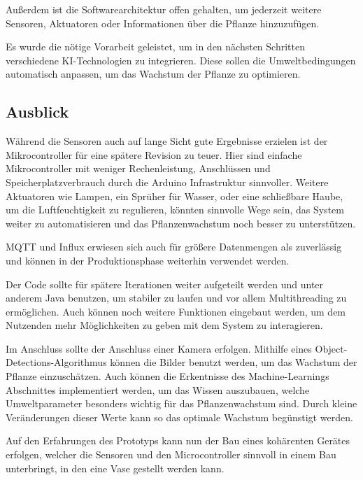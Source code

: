 Außerdem ist die Softwarearchitektur offen gehalten, um jederzeit weitere Sensoren, Aktuatoren oder Informationen über die Pflanze hinzuzufügen.

Es wurde die nötige Vorarbeit geleistet, um in den nächsten Schritten verschiedene KI-Technologien zu integrieren. Diese sollen die Umweltbedingungen automatisch anpassen, um das Wachstum der Pflanze zu optimieren.

\subsection{Ausblick}
Während die Sensoren auch auf lange Sicht gute Ergebnisse erzielen ist der Mikrocontroller für eine spätere Revision zu teuer. Hier sind einfache Mikrocontroller mit weniger Rechenleistung, Anschlüssen und Speicherplatzverbrauch durch die Arduino Infrastruktur sinnvoller. Weitere Aktuatoren wie Lampen, ein Sprüher für Wasser, oder eine schließbare Haube, um die Luftfeuchtigkeit zu regulieren, könnten sinnvolle Wege sein, das System weiter zu automatisieren und das Pflanzenwachstum noch besser zu unterstützen.

MQTT und Influx erwiesen sich auch für größere Datenmengen als zuverlässig und können in der Produktionsphase weiterhin verwendet werden.

Der Code sollte für spätere Iterationen weiter aufgeteilt werden und unter anderem Java benutzen, um stabiler zu laufen und vor allem Multithreading zu ermöglichen. Auch können noch weitere Funktionen eingebaut werden, um dem Nutzenden mehr Möglichkeiten zu geben mit dem System zu interagieren.

Im Anschluss sollte der Anschluss einer Kamera erfolgen. Mithilfe eines Object-Detections-Algorithmus können die Bilder benutzt werden, um das Wachstum der Pflanze einzuschätzen. Auch können die Erkentnisse des Machine-Learnings Abschnittes implementiert werden, um das Wissen auszubauen, welche Umweltparameter besonders wichtig für das Pflanzenwachstum sind. Durch kleine Veränderungen dieser Werte kann so das optimale Wachstum begünstigt werden.

Auf den Erfahrungen des Prototyps kann nun der Bau eines kohärenten Gerätes erfolgen, welcher die Sensoren und den Microcontroller sinnvoll in einem Bau unterbringt, in den eine Vase gestellt werden kann.



